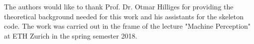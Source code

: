 \begin{acks}
	The authors would like to thank Prof. Dr. Otmar Hilliges for providing the theoretical background needed for this work and his assistants for the skeleton code. The work was carried out in the frame of the lecture "Machine Perception" at ETH Zurich in the spring semester 2018.
	
\end{acks}




%
%
%
